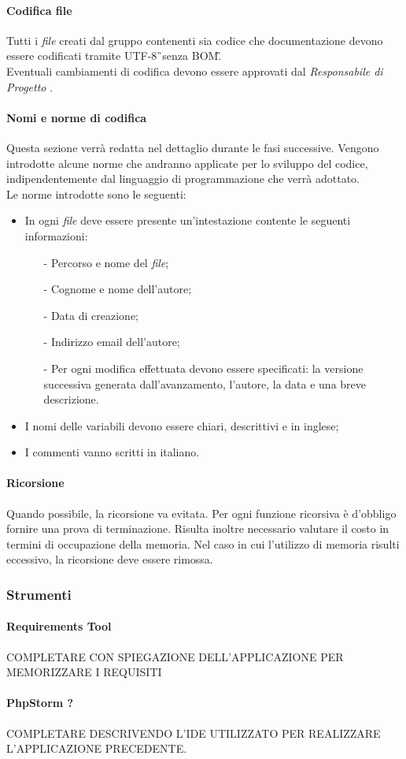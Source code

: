 \paragraph{Codifica file}
Tutti i \textit{file} creati dal gruppo contenenti sia codice che documentazione devono essere codificati tramite UTF-8\G\ senza BOM\G.\\
Eventuali cambiamenti di codifica devono essere approvati dal \textit{Responsabile di Progetto} .
\paragraph{Nomi e norme di codifica}
Questa sezione verrà redatta nel dettaglio durante le fasi successive.
Vengono introdotte alcune norme che andranno applicate per lo sviluppo del codice, indipendentemente dal linguaggio di programmazione che verrà adottato. \\
Le norme introdotte sono le seguenti:

\begin{itemize}
	\item In ogni \textit{file} deve essere presente un'intestazione contente le seguenti informazioni: 
	\begin{itemize}
		\item[-] Percorso e nome del \textit{file};
		\item[-] Cognome e nome dell'autore;
		\item[-] Data di creazione;
		\item[-] Indirizzo email dell’autore;
		\item[-] Per ogni modifica effettuata devono essere specificati: la versione successiva generata dall'avanzamento, l'autore, la data e una breve descrizione.	
	\end{itemize}
	\item I nomi delle variabili devono essere chiari, descrittivi e in inglese;
	\item I commenti vanno scritti in italiano.
\end{itemize}

\paragraph{Ricorsione}
Quando possibile, la ricorsione va evitata. Per ogni funzione ricorsiva è d'obbligo fornire una prova di terminazione. Risulta inoltre necessario valutare il costo in termini di occupazione della memoria. Nel caso in cui l’utilizzo di memoria risulti eccessivo, la ricorsione deve essere rimossa.
\subsubsection{Strumenti}
\paragraph{Requirements Tool}
COMPLETARE CON SPIEGAZIONE DELL'APPLICAZIONE PER MEMORIZZARE I REQUISITI
\paragraph{PhpStorm ?}
COMPLETARE DESCRIVENDO L'IDE UTILIZZATO PER REALIZZARE L'APPLICAZIONE PRECEDENTE.

\newpage
